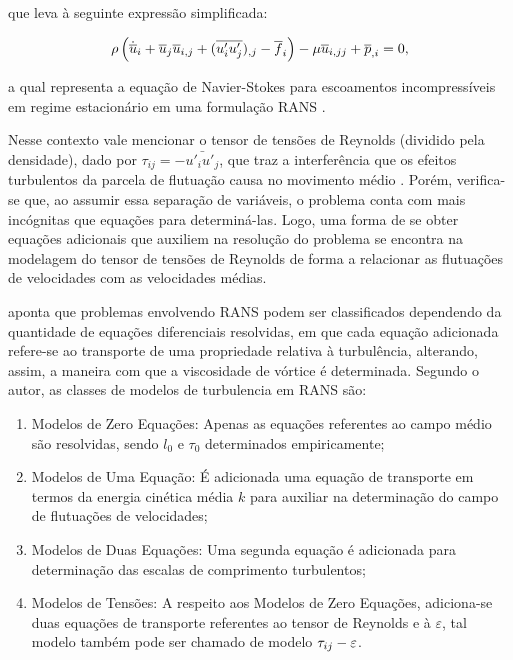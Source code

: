 \noindent que leva à seguinte expressão simplificada:

\begin{equation}
    \rho\left({\dot{\overline{u}}_i+\overline{u}_j\overline{u}_{i,j}+(\overline{u'_iu'_j})_{,j}-\overline{f}_i}\right)-\mu\overline{u}_{i,jj}+\overline{p}_{,i}=0\text{,}
    \label{eq:RANS-estac}
\end{equation}

\noindent a qual representa a equação de Navier-Stokes para escoamentos incompressíveis em regime estacionário em uma formulação RANS \cite{chou1945velocity,alfonsi2009reynolds}.

Nesse contexto vale mencionar o tensor de tensões de Reynolds (dividido pela densidade), dado por $\tau_{ij}=-\bar{u'_iu'_j}$, que traz a interferência que os efeitos turbulentos da parcela de flutuação causa no movimento médio \cite{chou1945velocity,alfonsi2009reynolds}. Porém, verifica-se que, ao assumir essa separação de variáveis, o problema conta com mais incógnitas que equações para determiná-las. Logo, uma forma de se obter equações adicionais que auxiliem na resolução do problema se encontra na modelagem do tensor de tensões de Reynolds de forma a relacionar as flutuações de velocidades com as velocidades médias.

 aponta que problemas envolvendo RANS podem ser classificados dependendo da quantidade de equações diferenciais resolvidas, em que cada equação adicionada refere-se ao transporte de uma propriedade relativa à turbulência, alterando, assim, a maneira com que a viscosidade de vórtice é determinada. Segundo o autor, as classes de modelos de turbulencia em RANS são:

\begin{enumerate}[label=\alph*.]
    \item Modelos de Zero Equações: Apenas as equações referentes ao campo médio são resolvidas, sendo $l_0$ e $\tau_0$ determinados empiricamente;
    \item Modelos de Uma Equação: É adicionada uma equação de transporte em termos da energia cinética média $k$ para auxiliar na determinação do campo de flutuações de velocidades;
    \item Modelos de Duas Equações: Uma segunda equação é adicionada para determinação das escalas de comprimento turbulentos;
    \item Modelos de Tensões: A respeito aos Modelos de Zero Equações, adiciona-se duas equações de transporte referentes ao tensor de Reynolds e à $\varepsilon$, tal modelo também pode ser chamado de modelo $\tau_{ij}-\varepsilon$.
\end{enumerate}


